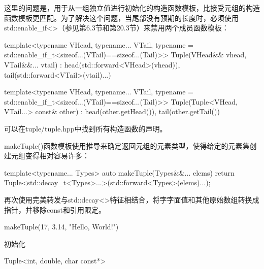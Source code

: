 这里的问题是，用于从一组独立值进行初始化的构造函数模板，比接受元组的构造函数模板更匹配。为了解决这个问题，当尾部没有预期的长度时，必须使用std::enable\_if<>（参见第6.3节和第20.3节）来禁用两个成员函数模板：

\begin{cpp}
template<typename VHead, typename... VTail,
		typename = std::enable_if_t<sizeof...(VTail)==sizeof...(Tail)>>
Tuple(VHead&& vhead, VTail&&... vtail)
: head(std::forward<VHead>(vhead)),
tail(std::forward<VTail>(vtail)...) { }

template<typename VHead, typename... VTail,
		typename = std::enable_if_t<sizeof...(VTail)==sizeof...(Tail)>>
Tuple(Tuple<VHead, VTail...> const& other)
: head(other.getHead()), tail(other.getTail()) { }
\end{cpp}

可以在tuple/tuple.hpp中找到所有构造函数的声明。

makeTuple()函数模板使用推导来确定返回元组的元素类型，使得给定的元素集创建元组变得相对容易许多：

\begin{cpp}
template<typename... Types>
auto makeTuple(Types&&... elems)
{
	return Tuple<std::decay_t<Types>...>(std::forward<Types>(elems)...);
}
\end{cpp}

再次使用完美转发与std::decay<>特征相结合，将字字面值和其他原始数组转换成指针，并移除const和引用限定。

\begin{cpp}
makeTuple(17, 3.14, "Hello, World!")
\end{cpp}

初始化

\begin{cpp}
Tuple<int, double, char const*>
\end{cpp}







